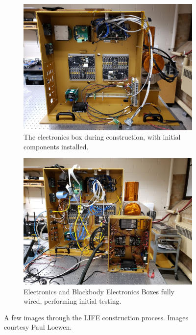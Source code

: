 \begin{figure}
\begin{subfigure}[h]{0.4\textwidth}
    \end{subfigure}
    \begin{subfigure}[h]{0.4\textwidth}
        \centering
        \includegraphics[width=\textwidth]{chap3_images/ebox_during_construction.jpg}
        \caption{The electronics box during construction, with initial components installed.}
        \label{fig:Ebox_during_construction}
    \end{subfigure}
    \begin{subfigure}[h]{0.6\textwidth}
        \centering
        \includegraphics[width=\textwidth]{chap3_images/electronics_boxes_initial_boot.jpg}
        \caption{Electronics and Blackbody Electronics Boxes fully wired, performing initial testing.}
        \label{fig:Ebox_fully_wired}
    \end{subfigure}
    \caption{A few images through the LIFE construction process. Images courtesy Paul Loewen.}
    \label{LIFE_construction}
\end{figure}

